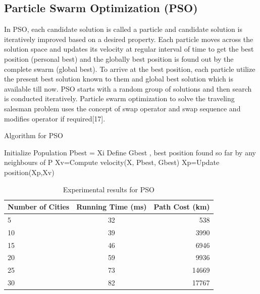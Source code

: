 \documentclass[conference]{IEEEtran}
\begin{document}
\subsection {Particle Swarm Optimization (PSO)}
In PSO, each candidate solution is called a particle and candidate solution is iteratively improved based on a desired property. Each particle moves across the solution space and  updates its velocity at regular interval of time to get the best position (personal best) and the globally best position is found out by the complete swarm (global best). To arrive at the best position, each particle utilize the present best solution known to them and global best solution which is available till now. PSO starts with a random group of solutions and then search is conducted iteratively. Particle swarm optimization to solve the traveling salesman problem uses the concept of swap operator and swap sequence and modifies operator if required[17]. 

\begin{algorithm}[H]
\caption{Algorithm for PSO}
\begin{algorithmic}[1]
\STATE Initialize Population
\REPEAT
{}
\STATE Pbest = Xi
\ENDIF
\ENDFOR 
\STATE Define Gbest , best position found so far by any neighbours of P
\STATE Xv=Compute velocity(X, Pbest, Gbest)
\STATE Xp=Update position(Xp,Xv)
\ENDFOR
{} 
\end{algorithmic}
\end{algorithm} 



\begin{table}[h!]
  \begin{center}
    \label{tab:table2} \caption{Experimental results for PSO}
    \begin{tabular}{l|c|r}
      \textbf{Number of Cities} & \textbf{Running Time (ms)} & \textbf{Path Cost (km)}\\
      \hline
      5 & 32 & 538\\
      10 & 39 & 3990\\
      15 & 46 & 6946\\
      20 & 59 & 9936\\ 
      25 & 73 & 14669\\
      30 & 82 & 17767\\
    \end{tabular}
  \end{center}
\end{table}
\end{document}
